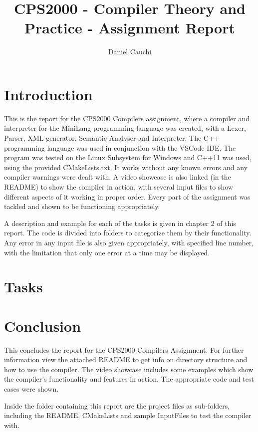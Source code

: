 \documentclass{report}
\begin{document}
\title{CPS2000  - Compiler Theory and Practice - Assignment Report}
\author{Daniel Cauchi}
\date{}
\maketitle

\tableofcontents

\chapter{Introduction}
This is the report for the CPS2000 Compilers assignment, where a compiler and interpreter for the MiniLang programming language was created, with a Lexer, Parser, XML generator, Semantic Analyser and Interpreter. The C++ programming language was used in conjunction with the VSCode IDE. The program was tested on the Linux Subsystem for Windows and C++11 was used, using the provided CMakeLists.txt. It works without any known errors and any compiler warnings were dealt with. A video showcase is also linked (in the README) to show the compiler in action, with several input files to show different aspects of it working in proper order. Every part of the assignment was tackled and shown to be functioning appropriately.

A description and example for each of the tasks is given in chapter 2 of this report. The code is divided into folders to categorize them by their functionality. Any error in any input file is also given appropriately, with specified line number, with the limitation that only one error at a time may be displayed.

\chapter{Tasks}

\pagebreak

\pagebreak

\pagebreak

\pagebreak

\pagebreak

\chapter{Conclusion}
This concludes the report for the CPS2000-Compilers Assignment. For further information view the attached README to get info on directory structure and how to use the compiler. The video showcase includes some examples which show the compiler's functionality and features in action. The appropriate code and test cases were shown. 

Inside the folder containing this report are the project ﬁles as sub-folders, including the README, CMakeLists and sample InputFiles to test the compiler with.


\pagebreak



\end{document}
